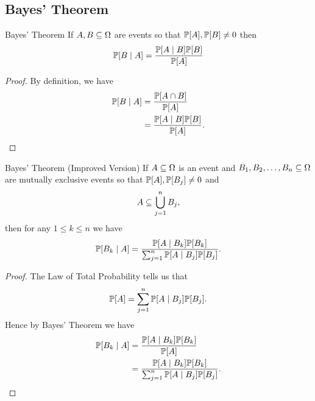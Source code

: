 \documentclass[class=article, crop=false]{standalone}
\begin{document}
  \subsection{Bayes' Theorem}
  \begin{theorem}{Bayes' Theorem}
    If $A, B\sse \Omega$ are events so that $\P[A], \P[B]\neq 0$ then
    \[
      \P[B\mid A] = \frac{\P[A\mid B]\P[B]}{\P[A]}
    \]
    \begin{proof}
      By definition, we have
      \begin{align*}
        \P[B\mid A] &= \frac{\P[A\cap B]}{\P[A]} \\
                    &= \frac{\P[A\mid B]\P[B]}{\P[A]}.
      \end{align*}
    \end{proof}
  \end{theorem}
  \begin{theorem}{Bayes' Theorem (Improved Version)}
    If $A\sse \Omega$ is an event and $B_1, B_2,\dotsc, B_n\sse \Omega$ are mutually exclusive events so that $\P[A], \P[B_j]\neq 0$ and
    \[
      A\sse \bigcup_{j = 1}^nB_j,
    \]
    then for any $1\leq k\leq n$ we have
    \[
      \P[B_k\mid A] = \frac{\P[A\mid B_k]\P[B_k]}{\sum_{j=1}^{n}\P[A\mid B_j]\P[B_j]}.
    \]
    \begin{proof}
      The Law of Total Probability tells us that
      \[
        \P[A] = \sum_{j=1}^{n}\P[A\mid B_j]\P[B_j].
      \]
      Hence by Bayes' Theorem we have
      \begin{align*}
        \P[B_k\mid A] &= \frac{\P[A\mid B_k]\P[B_k]}{\P[A]} \\
                      &= \frac{\P[A\mid B_k]\P[B_k]}{\sum_{j=1}^{n}\P[A\mid B_j]\P[B_j]}.
      \end{align*}
    \end{proof}
  \end{theorem}
\end{document}
